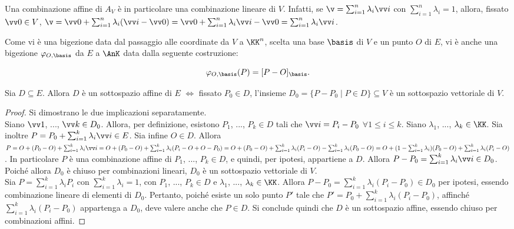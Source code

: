 \documentclass[11pt]{article}
\begin{document}
	\begin{remark}\nl
		\li Una combinazione affine di $A_V$ è in particolare una combinazione lineare di $V$. Infatti,
		se $\v = \sum_{i=1}^n \lambda_i \vv i$ con $\sum_{i=1}^n \lambda_i = 1$, allora, fissato
		$\vv 0 \in V$, $\v = \vv 0 + \sum_{i=1}^n \lambda_i (\vv i - \vv 0) = \vv 0 + \sum_{i=1}^n \lambda_i \vv i - \vv 0 = \sum_{i=1}^n \lambda_i \vv i$.
		
		\li Come vi è una bigezione data dal passaggio alle coordinate da $V$ a $\KK^n$, scelta una base
		$\basis$ di $V$ e un punto $O$ di $E$, vi è anche una bigezione $\varphi_{O, \basis}$ da $E$ a $\AnK$ data
		dalla seguente costruzione:
		
		\[ \varphi_{O, \basis}(P) = [P-O]_\basis. \]
		
		\vskip 0.05in
	\end{remark}
	
	\begin{proposition}
		Sia $D \subseteq E$. Allora $D$ è un sottospazio affine di $E$ $\iff$ fissato $P_0 \in D$, l'insieme
		$D_0 = \{ P - P_0 \mid P \in D \} \subseteq V$ è un sottospazio vettoriale di $V$.
	\end{proposition}
	
	\begin{proof}
		Si dimostrano le due implicazioni separatamente. \\
		
		\rightproof Siano $\vv 1$, ..., $\vv k \in D_0$. Allora, per definizione, esistono $P_1$, ...,
		$P_k \in D$ tali che $\vv i = P_i - P_0$ $\forall 1 \leq i \leq k$. Siano $\lambda_1$, ...,
		$\lambda_k \in \KK$. Sia inoltre $P = P_0 + \sum_{i=1}^k \lambda_i \vv i \in E$. Sia infine
		$O \in D$. Allora $P = O + (P_0 - O) + \sum_{i=1}^k \lambda_i \vv i = O + (P_0 - O) + \sum_{i=1}^k \lambda_i (P_i - O + O - P_0) = O + (P_0 - O) + \sum_{i=1}^k \lambda_i (P_i - O) - \sum_{i=1}^k \lambda_i (P_0 - O) =
		O + (1-\sum_{i=1}^k \lambda_i) (P_0 - O) + \sum_{i=1}^k \lambda_i (P_i - O)$. In particolare $P$
		è una combinazione affine di $P_1$, ..., $P_k \in D$, e quindi, per ipotesi, appartiene a $D$. Allora
		$P - P_0 =  \sum_{i=1}^k \lambda_i \vv i \in D_0$. Poiché allora $D_0$ è chiuso per combinazioni lineari,
		$D_0$ è un sottospazio vettoriale di $V$. \\
		
		\leftproof Sia $P = \sum_{i=1}^k \lambda_i P_i$ con $\sum_{i=1}^k \lambda_i = 1$, con $P_1$, ..., $P_k \in D$ e
		$\lambda_1$, ..., $\lambda_k \in \KK$. Allora $P - P_0 = \sum_{i=1}^k \lambda_i (P_i - P_0) \in D_0$ per ipotesi, essendo combinazione lineare di elementi di $D_0$. Pertanto, poiché esiste un solo punto $P'$
		tale che $P' = P_0 + \sum_{i=1}^k \lambda_i (P_i - P_0)$, affinché $\sum_{i=1}^k \lambda_i (P_i - P_0)$
		appartenga a $D_0$, deve valere anche che $P \in D$. Si conclude quindi che $D$ è un sottospazio
		affine, essendo chiuso per combinazioni affini.
	\end{proof}
	
\end{document}

